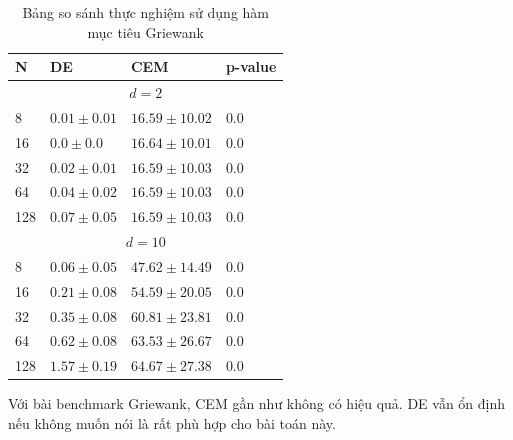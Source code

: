 \documentclass[10pt]{report}
\begin{document}
\begin{table}[H]\centering
	\caption{Bảng so sánh thực nghiệm sử dụng hàm mục tiêu Griewank}
	\begin{tabularx}{0.8\textwidth}{p{5em}XXl}
		\toprule
		\textbf{N} & \textbf{DE}                & \textbf{CEM}        & \textbf{p-value} \\
		\midrule
		\multicolumn{4}{c}{\(d = 2\)}                                                    \\
		\midrule
		8          & \(\mathbf{0.01 \pm 0.01}\) & \(16.59 \pm 10.02\) & \(\mathbf{0.0}\) \\
		16         & \(\mathbf{0.0 \pm 0.0}\)   & \(16.64 \pm 10.01\) & \(\mathbf{0.0}\) \\
		32         & \(\mathbf{0.02 \pm 0.01}\) & \(16.59 \pm 10.03\) & \(\mathbf{0.0}\) \\
		64         & \(\mathbf{0.04 \pm 0.02}\) & \(16.59 \pm 10.03\) & \(\mathbf{0.0}\) \\
		128        & \(\mathbf{0.07 \pm 0.05}\) & \(16.59 \pm 10.03\) & \(\mathbf{0.0}\) \\
		\midrule
		\multicolumn{4}{c}{\(d = 10\)}                                                   \\
		\midrule
		8          & \(\mathbf{0.06 \pm 0.05}\) & \(47.62 \pm 14.49\) & \(\mathbf{0.0}\) \\
		16         & \(\mathbf{0.21 \pm 0.08}\) & \(54.59 \pm 20.05\) & \(\mathbf{0.0}\) \\
		32         & \(\mathbf{0.35 \pm 0.08}\) & \(60.81 \pm 23.81\) & \(\mathbf{0.0}\) \\
		64         & \(\mathbf{0.62 \pm 0.08}\) & \(63.53 \pm 26.67\) & \(\mathbf{0.0}\) \\
		128        & \(\mathbf{1.57 \pm 0.19}\) & \(64.67 \pm 27.38\) & \(\mathbf{0.0}\) \\
		\bottomrule
	\end{tabularx}
\end{table}

Với bài benchmark Griewank, CEM gần như không có hiệu quả. DE vẫn ổn định nếu không muốn nói là rất phù hợp cho bài toán này.
\end{document}
